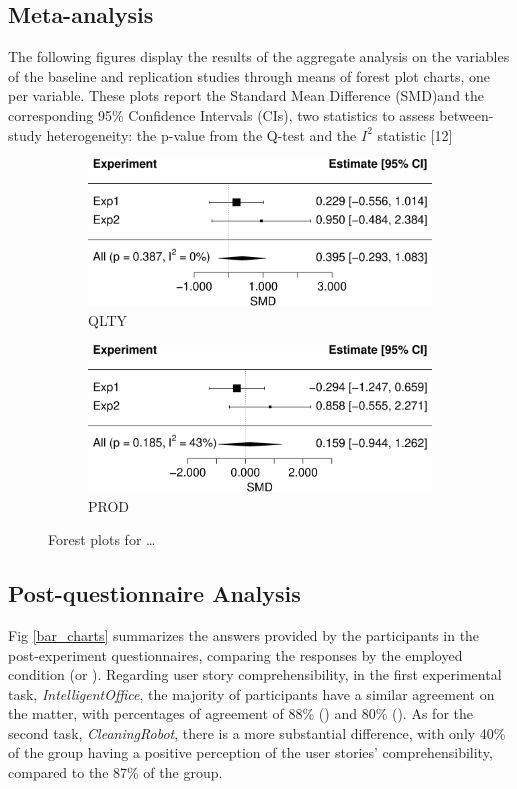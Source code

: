 \subsection{Meta-analysis}
The following figures display the results of the aggregate analysis on the variables of the baseline and replication studies through means of forest plot charts, one per variable. These plots report the Standard Mean Difference (SMD)and the corresponding 95\% Confidence Intervals (CIs), two statistics to assess between-study heterogeneity: the p-value from the Q-test and the $I^2$ statistic [12]  

\begin{figure}[htbp]
    \begin{subfigure}{0.49\textwidth}
        \includegraphics[width=\linewidth]{figures/forest_plots/QLTY.png}
        \caption{QLTY}
        \label{fp_qlty}
    \end{subfigure}\hfil
    \begin{subfigure}{0.49\textwidth}
        \includegraphics[width=\linewidth]{figures/forest_plots/PROD.png}
        \caption{PROD}
        \label{fp_prod}
    \end{subfigure}
    \caption{Forest plots for \dots}
    \label{fp_qlty_prod}
\end{figure}

\subsection{Post-questionnaire Analysis}
Fig \ref{bar_charts} summarizes the answers provided by the participants in the post-experiment questionnaires, comparing the responses by the employed condition (\tdd or \notdd).
Regarding user story comprehensibility, in the first experimental task, \textit{IntelligentOffice}, the majority of participants have a similar agreement on the matter, with percentages of agreement of 88\% (\tdd) and 80\% (\notdd). As for the second task, \textit{CleaningRobot}, there is a more substantial difference, with only 40\% of the \tdd group having a positive perception of the user stories' comprehensibility, compared to the 87\% of the \notdd group.

